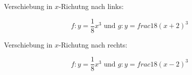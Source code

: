 \newpage


Verschiebung in $x$-Richutng nach links:

$$f: y=\frac18x^3 \text{ und } g: y=frac18(x+2)^3$$

Verschiebung in $x$-Richutng nach rechts:

$$f: y=\frac18x^3 \text{ und } g: y=frac18(x-2)^3$$


\newpage




